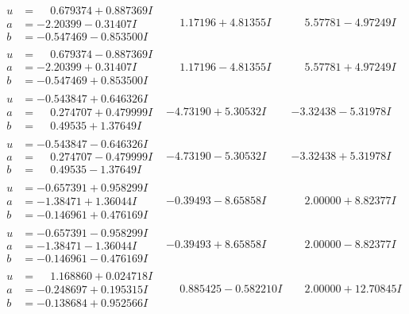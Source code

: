 \documentclass[1p]{elsarticle_modified}
\theoremstyle{definition}
\begin{document}
$$\begin{array}{c|c|c}
\begin{aligned}
u &= \phantom{-}0.679374 + 0.887369 I \\
a &= -2.20399 - 0.31407 I \\
b &= -0.547469 - 0.853500 I\end{aligned}
 & \phantom{-}1.17196 + 4.81355 I & \phantom{-}5.57781 - 4.97249 I \\ \hline\begin{aligned}
u &= \phantom{-}0.679374 - 0.887369 I \\
a &= -2.20399 + 0.31407 I \\
b &= -0.547469 + 0.853500 I\end{aligned}
 & \phantom{-}1.17196 - 4.81355 I & \phantom{-}5.57781 + 4.97249 I \\ \hline\begin{aligned}
u &= -0.543847 + 0.646326 I \\
a &= \phantom{-}0.274707 + 0.479999 I \\
b &= \phantom{-}0.49535 + 1.37649 I\end{aligned}
 & -4.73190 + 5.30532 I & -3.32438 - 5.31978 I \\ \hline\begin{aligned}
u &= -0.543847 - 0.646326 I \\
a &= \phantom{-}0.274707 - 0.479999 I \\
b &= \phantom{-}0.49535 - 1.37649 I\end{aligned}
 & -4.73190 - 5.30532 I & -3.32438 + 5.31978 I \\ \hline\begin{aligned}
u &= -0.657391 + 0.958299 I \\
a &= -1.38471 + 1.36044 I \\
b &= -0.146961 + 0.476169 I\end{aligned}
 & -0.39493 - 8.65858 I & \phantom{-}2.00000 + 8.82377 I \\ \hline\begin{aligned}
u &= -0.657391 - 0.958299 I \\
a &= -1.38471 - 1.36044 I \\
b &= -0.146961 - 0.476169 I\end{aligned}
 & -0.39493 + 8.65858 I & \phantom{-}2.00000 - 8.82377 I \\ \hline\begin{aligned}
u &= \phantom{-}1.168860 + 0.024718 I \\
a &= -0.248697 + 0.195315 I \\
b &= -0.138684 + 0.952566 I\end{aligned}
 & \phantom{-}0.885425 - 0.582210 I & \phantom{-}2.00000 + 12.70845 I \\ \hline\begin{aligned}

\end{aligned}
\end{array}$$
\end{document}
